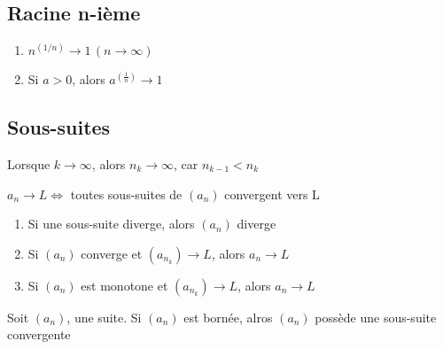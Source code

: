 \documentclass{article}
\begin{document}
\subsection{Racine n-ième}

\begin{theorem}
    \begin{enumerate}
	\item $n^(1/n) \rightarrow 1 \, (n \rightarrow \infty)$
	\item Si $a>0$, alors $a^(\frac{1}{n}) \rightarrow 1 $
    \end{enumerate}
\end{theorem}

\subsection{Sous-suites}

\begin{definition}
\end{definition}

\begin{remark}
    Lorsque $k \rightarrow \infty$, alors $n_k \rightarrow \infty$, car
    $n_{k-1} < n_k$
\end{remark}

\begin{theorem}
    $a_n \rightarrow L \Longleftrightarrow$ toutes sous-suites de $(a_n)$
    convergent vers L
\end{theorem}

\begin{corollary}
    \begin{enumerate}
	\item Si une sous-suite diverge, alors $(a_n)$ diverge
	\item Si $(a_n)$ converge et $(a_{n_k}) \rightarrow L$, alors $a_n
	    \rightarrow L$
	\item Si $(a_n)$ est monotone et $(a_{n_k}) \rightarrow L$, alors $a_n
	    \rightarrow L$
    \end{enumerate}
\end{corollary}

\begin{theorem}
    Soit $(a_n)$, une suite. Si $(a_n)$ est bornée, alros $(a_n)$ possède
    une sous-suite convergente
\end{theorem}
\end{document}
